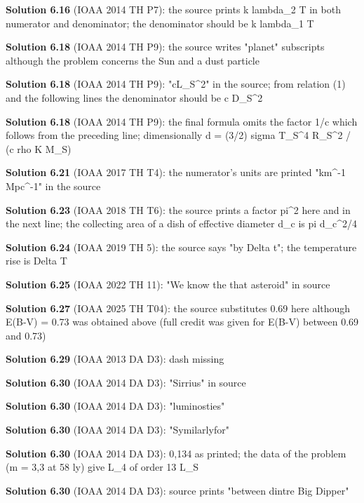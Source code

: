\noindent\textbf{Solution 6.16} (IOAA 2014 TH P7): the source prints k lambda\_2 T in both numerator and denominator; the denominator should be k lambda\_1 T
\smallskip

\noindent\textbf{Solution 6.18} (IOAA 2014 TH P9): the source writes "planet" subscripts although the problem concerns the Sun and a dust particle
\smallskip

\noindent\textbf{Solution 6.18} (IOAA 2014 TH P9): "cL\_S\^{}2" in the source; from relation (1) and the following lines the denominator should be c D\_S\^{}2
\smallskip

\noindent\textbf{Solution 6.18} (IOAA 2014 TH P9): the final formula omits the factor 1/c which follows from the preceding line; dimensionally d = (3/2) sigma T\_S\^{}4 R\_S\^{}2 / (c rho K M\_S)
\smallskip

\noindent\textbf{Solution 6.21} (IOAA 2017 TH T4): the numerator's units are printed "km\^{}-1 Mpc\^{}-1" in the source
\smallskip

\noindent\textbf{Solution 6.23} (IOAA 2018 TH T6): the source prints a factor pi\^{}2 here and in the next line; the collecting area of a dish of effective diameter d\_c is pi d\_c\^{}2/4
\smallskip

\noindent\textbf{Solution 6.24} (IOAA 2019 TH 5): the source says "by Delta t"; the temperature rise is Delta T
\smallskip

\noindent\textbf{Solution 6.25} (IOAA 2022 TH 11): "We know the that asteroid" in source
\smallskip

\noindent\textbf{Solution 6.27} (IOAA 2025 TH T04): the source substitutes 0.69 here although E(B-V) = 0.73 was obtained above (full credit was given for E(B-V) between 0.69 and 0.73)
\smallskip

\noindent\textbf{Solution 6.29} (IOAA 2013 DA D3): dash missing
\smallskip

\noindent\textbf{Solution 6.30} (IOAA 2014 DA D3): "Sirrius" in source
\smallskip

\noindent\textbf{Solution 6.30} (IOAA 2014 DA D3): "luminosties"
\smallskip

\noindent\textbf{Solution 6.30} (IOAA 2014 DA D3): "Symilarlyfor"
\smallskip

\noindent\textbf{Solution 6.30} (IOAA 2014 DA D3): 0,134 as printed; the data of the problem (m = 3,3 at 58 ly) give L\_4 of order 13 L\_S
\smallskip

\noindent\textbf{Solution 6.30} (IOAA 2014 DA D3): source prints "between dintre Big Dipper"
\smallskip

